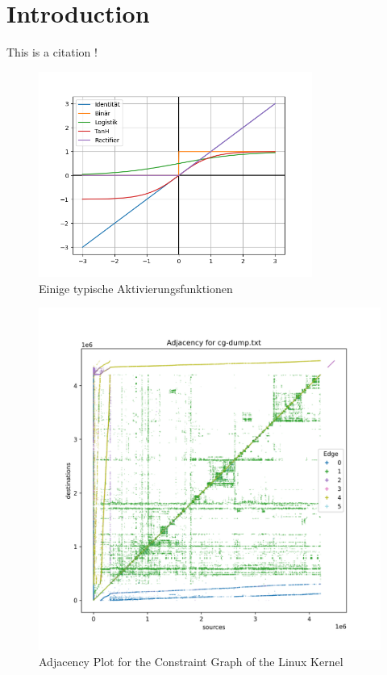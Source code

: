 \chapter{Introduction} \label{chap:intro}
This is a citation \autocite{juliani2018unity}!
\begin{figure}
    \centering
    \includegraphics[width=0.8\textwidth]{img/test.png}
    \caption{Einige typische Aktivierungsfunktionen}
    \label{fig:actfn}
\end{figure}

\begin{figure}
    \centering
    \includegraphics[width=1.\textwidth]{img/linux-consg.png}
    \caption{Adjacency Plot for the Constraint Graph of the Linux Kernel}
    \label{fig:linux-consg}
\end{figure}

